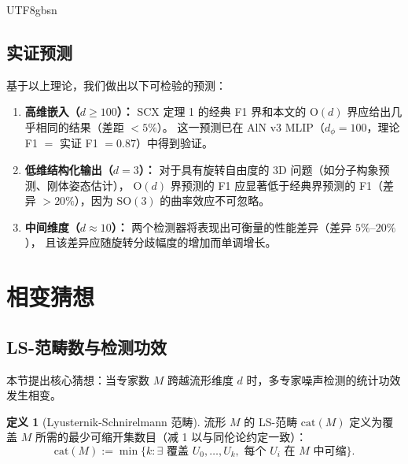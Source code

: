 \documentclass[12pt,a4paper]{article}
\theoremstyle{plain}
\theoremstyle{definition}
\newtheorem{definition}[theorem]{定义}
\theoremstyle{remark}
\newcommand{\Od}{\mathrm{O}(d)}
\newcommand{\SO}{\mathrm{SO}}
\begin{document}
\begin{CJK}{UTF8}{gbsn}
\subsection{实证预测}

基于以上理论，我们做出以下可检验的预测：

\begin{enumerate}
    \item \textbf{高维嵌入（$d \geq 100$）：}
    SCX 定理 1 的经典 F1 界和本文的 $\Od$ 界应给出几乎相同的结果（差距 $< 5\%$）。
    这一预测已在 AlN v3 MLIP（$d_\phi = 100$，理论 F1 $=$ 实证 F1 $= 0.87$）中得到验证。

    \item \textbf{低维结构化输出（$d = 3$）：}
    对于具有旋转自由度的 3D 问题（如分子构象预测、刚体姿态估计），
    $\Od$ 界预测的 F1 应显著低于经典界预测的 F1（差异 $> 20\%$），因为 $\SO(3)$ 的曲率效应不可忽略。

    \item \textbf{中间维度（$d \approx 10$）：}
    两个检测器将表现出可衡量的性能差异（差异 $5\%$--$20\%$），
    且该差异应随旋转分歧幅度的增加而单调增长。
\end{enumerate}

\newpage

\section{相变猜想}

\subsection{LS-范畴数与检测功效}

本节提出核心猜想：当专家数 $M$ 跨越流形维度 $d$ 时，多专家噪声检测的统计功效发生相变。

\begin{definition}[Lyusternik-Schnirelmann 范畴]\label{def:ls_cat}
流形 $M$ 的 LS-范畴 $\mathrm{cat}(M)$ 定义为覆盖 $M$ 所需的最少可缩开集数目（减 1 以与同伦论约定一致）：
\begin{equation}
    \mathrm{cat}(M) := \min\{k : \exists \text{ 覆盖 } U_0, \ldots, U_k, \text{ 每个 } U_i \text{ 在 } M \text{ 中可缩}\}.
\end{equation}
\end{definition}


\end{CJK}
\end{document}
